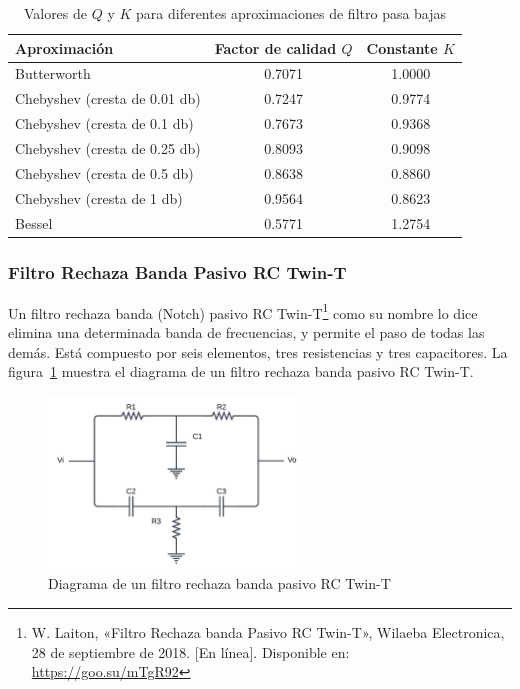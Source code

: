             \begin{table}[H]
                \centering
                \begin{tabular}{ l | c | c }
                    Aproximación & Factor de calidad $Q$ & Constante $K$ \\ \hline
                    Butterworth & 0.7071 & 1.0000 \\
                    Chebyshev (cresta de 0.01 db) & 0.7247 & 0.9774 \\
                    Chebyshev (cresta de 0.1 db) & 0.7673 & 0.9368 \\
                    Chebyshev (cresta de 0.25 db) & 0.8093 & 0.9098\\
                    Chebyshev (cresta de 0.5 db) & 0.8638 & 0.8860\\
                    Chebyshev (cresta de 1 db) & 0.9564 & 0.8623\\
                    Bessel & 0.5771 & 1.2754\\
                \end{tabular}
                \caption{Valores de $Q$ y $K$ para diferentes aproximaciones de filtro pasa bajas}
                \label{tab:valores_filtro_pasa_bajas}
            \end{table}

        \subsubsection{Filtro Rechaza Banda Pasivo RC Twin-T}

            Un filtro rechaza banda (Notch) pasivo RC Twin-T\footnote{W. Laiton, «Filtro Rechaza banda Pasivo RC Twin-T», Wilaeba Electronica, 28 de septiembre de 2018. [En línea]. Disponible en: \url{https://goo.su/mTgR92}} como su nombre lo dice elimina una determinada banda de frecuencias, y permite el paso de todas las demás. Está compuesto por seis elementos, tres resistencias y tres capacitores. La figura~\ref{fig:Filtro_Rechaza_Banda} muestra el diagrama de un filtro rechaza banda pasivo RC Twin-T.

            \begin{figure}[H]
                \centering
                \includegraphics[width=0.6\textwidth]{img/Desarrollo/Filtro_Rechaza_Banda.png}
                \caption[Diagrama de un filtro rechaza banda pasivo RC Twin-T.]{Diagrama de un filtro rechaza banda pasivo RC Twin-T}
                \label{fig:Filtro_Rechaza_Banda}
            \end{figure}


